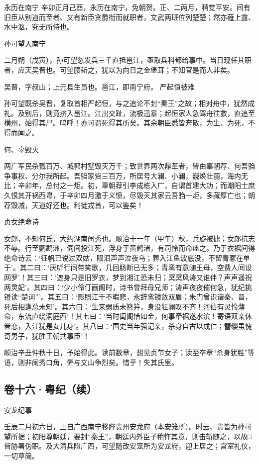 \documentclass[]{article}
\begin{document}
永历在南宁
辛卯正月己酉，永历在南宁，免朝贺。正、二两月，稍觉平安。间有旧臣从别道而至者、又有新臣贪爵衔而就职者，文武两班位列楚楚；然亦薤上露、水中沤，究无所恃也。

孙可望入南宁

二月朔（戊寅），孙可望忽发兵三千直抵邕江，亟取兵科都给事中。当日现任其职者，应天吴晋也。可望腰斩之，犹以为向日之金堡耳；不知官是而人非矣。

吴晋，字叔山；上元县生员也。邕江，即南宁府。 严起恒被难

孙可望既杀吴晋，复取首相严起恒，与之追论不封``秦王''之故；相对舟中，犹然成礼。及别后，则竟挤入邕江。江出交趾，流极迅暴；起恒家人急驾舟往救，直追至横州，始得其尸。呜呼！亦可谓死得其所矣。其余朝臣悉皆奔散，为生、为死，不得而闻之。

何、辜毁灭

两广军民杀戮百万、城郭村墅毁灭万千；致世界两次鼎革者，皆由辜朝荐、何吾驺争事权、分尔我所起。吾驺家赀三百万，所居号大澜、小澜，巍焕壮丽，海内无比；辛卯年，总付之一炬。初，辜朝荐引李成栋入广，自谓首建大功；而潮阳士庶久恨其开祸西粤，于辛卯四月激于义愤，尽毁灭其家云吾驺一炬，多藏厚亡也；朝荐毁减，天道好还也。利徒戎首，可以鉴矣！

贞女绝命诗

女郎，不知何氏，大约湖南闺秀也。顺治十一年（甲午）秋，兵旋被掳；女郎抗志不辱。行至鹦鹉洲，伺间投江死，浮身于黄鹤渚，有司怜而命瘗之。乃于衣裾间得绝命诗云：`征帆已说过双姑，眼泪声声泣夜乌；葬入江鱼波底没，不留青冢在单于'。其二曰：`厌听行间带笑歌，几回肠断已无多；青鸾有意随王母，空费人间设网罗'！其三曰：`遮身只是旧罗衣，梦到湘江恐未归；冥冥风涛又谁伴？声声遥祝两灵妃'。其四曰：`少小伶仃画阁时，诗书曾拜母兄师；涛声夜夜催何急，犹纪挑镫读``楚词'''。其五曰：`影照江干不暇悲，永辞鸾镜敛双眉；朱门曾识谐秦、晋，死后相逢总未知'。其六曰：`生来弱质未簪笄，身没狂澜叹不齐！河伯有灵怜薄命，东流直绕洞庭西'！其七曰：`当时闺阁惜如金，何事牵裾遂水滨！寄语双亲休眷恋，入江犹是女儿身'。其八曰：`国史当年强记亲，杀身自古以成仁；簪缨虽愧奇男子，犹胜王朝共事臣'！

顺治辛丑仲秋十日，予始得此。读前数章，想见贞节女子；读至卒章``杀身犹胜''等语，则非闺秀口角，俨与文山争烈矣。惜乎！失其氏里。

\hypertarget{header-n92}{%
\subsection{卷十六·粤纪（续）}\label{header-n92}}

安龙纪事

壬辰二月初六日，上自广西南宁移跸贵州安龙府（本安笼所）。时云、贵皆为孙可望所据；初阳尊朝廷，要封``秦王''，朝廷内外臣子稍忤其意，则击斩随之，以故□皆胁署伪职。及大清兵陷广西，可望随改安笼所为安龙府，迎上居之；宫室礼仪，一切草简。
\end{document}
